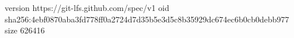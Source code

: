 version https://git-lfs.github.com/spec/v1
oid sha256:4ebf0870aba3fd778ff0a2724d7d35b5e3d5c8b35929dc674ec6b0cb0debb977
size 626416
